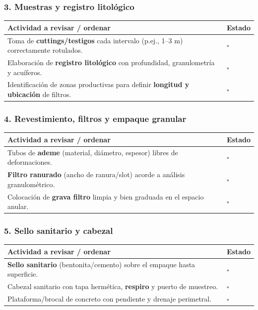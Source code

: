 \documentclass[12pt]{article}
\newcommand{\cbox}{\(\square\)} %
\begin{document}
	\subsubsection*{3. Muestras y registro litológico}
	\begin{tabularx}{\linewidth}{>{\raggedright\arraybackslash}p{0.93\linewidth} >{\centering\arraybackslash}m{0.07\linewidth}}
		\toprule
		\textbf{Actividad a revisar / ordenar} & \textbf{Estado}\\
		\midrule
		Toma de \textbf{cuttings/testigos} cada intervalo (p.ej., 1--3 m) correctamente rotulados. & \cbox \\
		Elaboración de \textbf{registro litológico} con profundidad, granulometría y acuíferos. & \cbox \\
		Identificación de zonas productivas para definir \textbf{longitud y ubicación} de filtros. & \cbox \\
		\bottomrule
	\end{tabularx}
	
	\subsubsection*{4. Revestimiento, filtros y empaque granular}
	\begin{tabularx}{\linewidth}{>{\raggedright\arraybackslash}p{0.93\linewidth} >{\centering\arraybackslash}m{0.07\linewidth}}
		\toprule
		\textbf{Actividad a revisar / ordenar} & \textbf{Estado}\\
		\midrule
		Tubos de \textbf{ademe} (material, diámetro, espesor) libres de deformaciones. & \cbox \\
		\textbf{Filtro ranurado} (ancho de ranura/slot) acorde a análisis granulométrico. & \cbox \\
		Colocación de \textbf{grava filtro} limpia y bien graduada en el espacio anular. & \cbox \\
		\bottomrule
	\end{tabularx}
	
	\subsubsection*{5. Sello sanitario y cabezal}
	\begin{tabularx}{\linewidth}{>{\raggedright\arraybackslash}p{0.93\linewidth} >{\centering\arraybackslash}m{0.07\linewidth}}
		\toprule
		\textbf{Actividad a revisar / ordenar} & \textbf{Estado}\\
		\midrule
		\textbf{Sello sanitario} (bentonita/cemento) sobre el empaque hasta superficie. & \cbox \\
		Cabezal sanitario con tapa hermética, \textbf{respiro} y puerto de muestreo. & \cbox \\
		Plataforma/brocal de concreto con pendiente y drenaje perimetral. & \cbox \\
		\bottomrule
	\end{tabularx}
	
\end{document}
